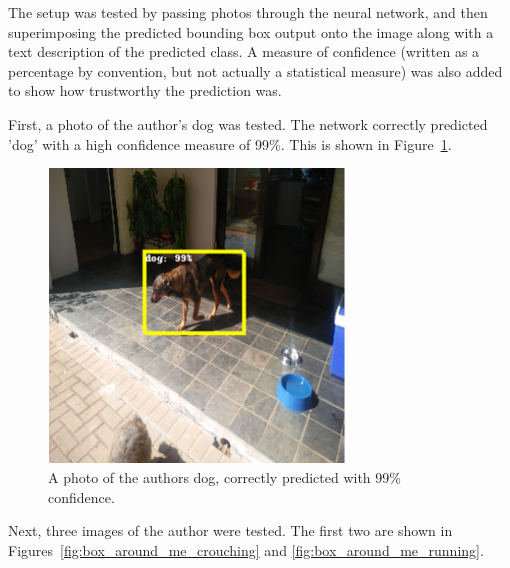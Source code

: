 The setup was tested by passing photos through the neural network, and then superimposing the predicted bounding box output onto the image along with a text description of the predicted class. A measure of confidence (written as a percentage by convention, but not actually a statistical measure) was also added to show how trustworthy the prediction was.

First, a photo of the author's dog was tested. The network correctly predicted 'dog' with a high confidence measure of 99\%. This is shown in Figure~\ref{fig:box_around_blossom}.

\begin{figure}[h!]
  \centering
  \includegraphics[width=0.7\textwidth]{methodology/box_around_blossom}
  \caption{\label{fig:box_around_blossom}A photo of the authors dog, correctly predicted with 99\% confidence.}
\end{figure}

Next, three images of the author were tested. The first two are shown in Figures~\ref{fig:box_around_me_crouching} and \ref{fig:box_around_me_running}.

